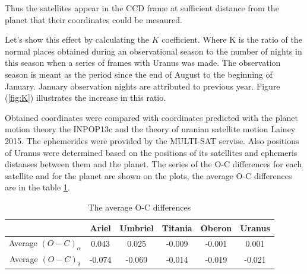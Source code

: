 \documentclass[]{article}
\begin{document}
 Thus the satellites appear in the CCD frame at sufficient distance from the planet that their coordinates could be mesaured.\par
Let's show this effect by calculating the $K$ coefficient. Where K is the ratio of the normal places obtained during an observational season to the number of nights in this season when a series of frames with Uranus was made. The observation season is meant as the period since the end of August to the beginning of January. January observation nights are attributed to previous year. Figure (\ref{fig:K}) illustrates the increase in this ratio.\par


Obtained coordinates were compared with coordinates predicted with the planet motion theory the INPOP13c and the theory of uranian satellite motion Lainey 2015. The ephemerides were provided by the MULTI-SAT servise\cite{5}. Also positions of Uranus were determined based on the positions of its satellites and ephemeris distanses between them and the planet.  The series of the O-C differences for each satellite and for the planet are shown on the plots, the average O-C differences are in the table \ref{mean_OC}.

\begin{table}
\begin{center}
\caption{The average O-C differences}
\label{mean_OC}
\begin{tabular}{|c|c|c|c|c|c|}
\hline
& Ariel&Umbriel&Titania& Oberon & Uranus \\
\hline
Average $(O-C)_\alpha$ & 0.043 & 0.025 & -0.009 & -0.001 & 0.001\\
Average $(O-C)_\delta$ & -0.074 & -0.069 & -0.014 & -0.019 & -0.021\\
\hline
\end{tabular}
\end{center}
\end{table}
\end{document}
